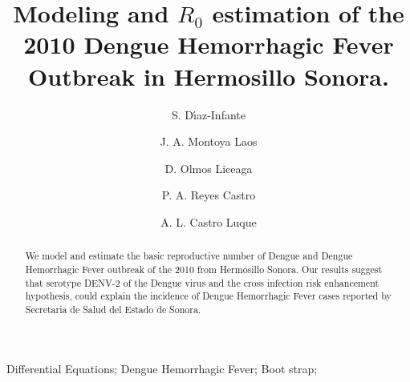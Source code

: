 \title{
		Modeling and $R_0$ estimation  of the 2010 Dengue Hemorrhagic Fever 
        Outbreak in Hermosillo Sonora.
}%
\author[conacyt-unison]{S. D\'{\i}az-Infante }
%
\author[unison]{J. A. Montoya Laos}
%
\author[unison]{D. Olmos Liceaga}
%
\author[colson]{P. A. Reyes Castro}
\author[colson]{A. L. Castro Luque}

\address[conacyt-unison]{
	CONACYT-Universidad de Sonora,
	Departamento de Matem\'aticas, Universidad de Sonora\\
	Blvd. Rosales y Luis Encinas S/N, Col. Centro, Hermosillo, Sonora, C.P. 83000,
	M\'exico\\
}
%
\address[unison]{
	Departamento de Matem\'aticas, Universidad de Sonora\\
	Blvd. Rosales y Luis Encinas S/N, Col. Centro, Hermosillo, Sonora, C.P. 83000,
	M\'exico\\
}
%
\address[colson]{
	Centro de Estudios en Salud y Sociedad,
	El Colegio de Sonora, Avenida Obregón No. 54, Colonia Centro, C.P. 83000,
	Hermosillo, Sonora. México
}
%
\begin{abstract}
	We model and estimate the basic reproductive number of Dengue  and 
	Dengue Hemorrhagic Fever outbreak of the 2010 from Hermosillo Sonora.
	Our results suggest that serotype DENV-2 of the Dengue virus and the cross 
    infection risk enhancement hypothesis, could explain the incidence of
    Dengue Hemorrhagic Fever cases reported by Secretaria de Salud del Estado de 
    Sonora.
\end{abstract}
\begin{keyword}
	Differential Equations;
	Dengue Hemorrhagic Fever;
	Boot strap;
\end{keyword}
